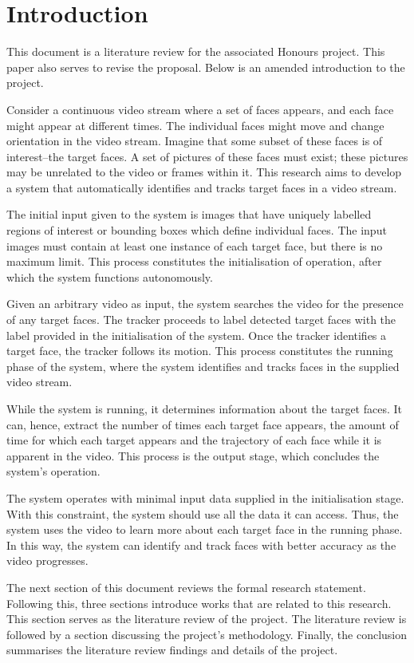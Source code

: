 \section{Introduction}
  This document is a literature review for the associated Honours project.
  This paper also serves to revise the proposal.
  Below is an amended introduction to the project.

  Consider a continuous video stream where a set of faces appears, and each face might appear at different times.
  The individual faces might move and change orientation in the video stream.
  Imagine that some subset of these faces is of interest--the target faces.
  A set of pictures of these faces must exist; these pictures may be unrelated to the video or frames within it.
  This research aims to develop a system that automatically identifies and tracks target faces in a video stream.

  The initial input given to the system is images that have uniquely labelled regions of interest or bounding boxes which define individual faces.
  The input images must contain at least one instance of each target face, but there is no maximum limit.
  This process constitutes the initialisation of operation, after which the system functions autonomously.

  Given an arbitrary video as input, the system searches the video for the presence of any target faces.
  The tracker proceeds to label detected target faces with the label provided in the initialisation of the system.
  Once the tracker identifies a target face, the tracker follows its motion.
  This process constitutes the running phase of the system, where the system identifies and tracks faces in the supplied video stream.

  While the system is running, it determines information about the target faces.
  It can, hence, extract the number of times each target face appears, the amount of time for which each target appears and the trajectory of each face while it is apparent in the video.
  This process is the output stage, which concludes the system's operation.

  The system operates with minimal input data supplied in the initialisation stage.
  With this constraint, the system should use all the data it can access. 
  Thus, the system uses the video to learn more about each target face in the running phase.
  In this way, the system can identify and track faces with better accuracy as the video progresses.

  The next section of this document reviews the formal research statement.
  Following this, three sections introduce works that are related to this research.
  This section serves as the literature review of the project. 
  The literature review is followed by a section discussing the project's methodology.
  Finally, the conclusion summarises the literature review findings and details of the project.
